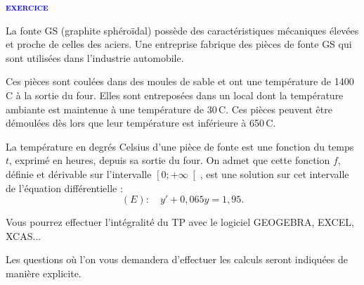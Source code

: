 \documentclass[a4paper,12pt]{article}
\newcounter{nexo}    %
\newcommand{\exo}{%
  \stepcounter{nexo} 
  \par{\textsf{\textbf{\textcolor{blue}{{\textsc{exercice  \arabic{nexo}}}}}}}
  }%
\begin{document}
\exo

 \medskip 

\medskip 


La fonte GS (graphite sphéroïdal) possède des caractéristiques mécaniques élevées et proche de celles des aciers. Une entreprise fabrique des pièces de fonte GS qui sont utilisées dans l'industrie automobile.

Ces pièces sont coulées dans des moules de sable et ont une température de 1400\,\degres C à la sortie du four. Elles sont entreposées dans un local dont la température ambiante est maintenue à une température de 30\,\degres C. Ces pièces peuvent être démoulées dès lors que leur température est inférieure à 650\,\degres C.

La température en degrés Celsius d'une pièce de fonte est une fonction du temps $t$, exprimé en heures, depuis sa sortie du four. On admet que cette fonction $f$, définie et dérivable sur l'intervalle $\left[ 0 ; +\infty\right[$, est une solution sur cet intervalle de l'équation différentielle :\[(E): \quad 
  y'+0,065y = 1,95.\]

Vous pourrez effectuer l'intégralité du TP avec le logiciel GEOGEBRA, EXCEL, XCAS...

Les questions où l'on vous demandera d'effectuer les calculs seront indiquées de manière explicite.

\bigskip
\end{document}
